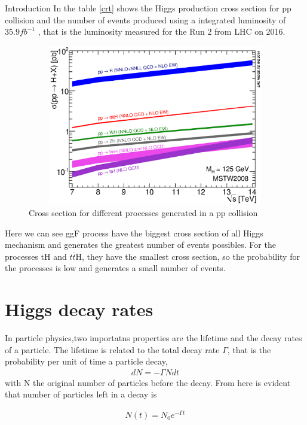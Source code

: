 \begin{chapter}{Introduction}
In the table \ref{crt} shows the Higgs production cross section for pp collision and the number of events produced using a integrated luminosity of $35.9 fb^{-1}$ , that is the luminosity measured for the Run 2 from LHC on 2016\cite{pd}.

\begin{figure}
\centering
\includegraphics[width=12cm,height=7cm]{Chapter1/7-14xsec.eps}
\caption{
Cross section for different processes generated in a pp collision \protect \footnotemark }
 \label{csp}
\end{figure}

Here we can see ggF process have the biggest cross section of all Higgs mechanism and generates the greatest number of events possibles. For the processes tH and $t\bar{t}$H, they have the smallest cross section, so the probability for the processes is low and generates a small number of events. 
\pagebreak
{}
\section{Higgs decay rates}
In particle physics,two importatns properties are the lifetime and the decay rates of a particle. The lifetime is related to the total decay rate $\Gamma$, that is the probability per unit of time a particle decay, 
\begin{align}
    dN=-\Gamma N dt
\end{align}
with N the original number of particles before the decay. From here is evident that number of particles left in a decay is 

\begin{align}
N(t)=N_0 e^{-\Gamma t}
\end{align}


\end{chapter}
